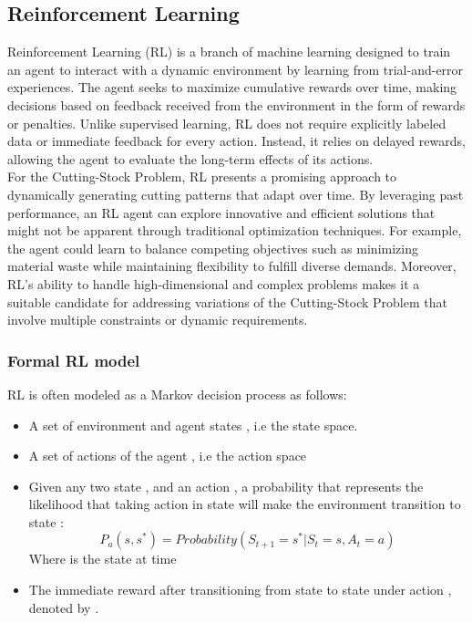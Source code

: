 \documentclass[a4paper]{article}
\begin{document}
    \subsection{Reinforcement Learning}
    Reinforcement Learning (RL) is a branch of machine learning designed to train an agent to interact with a dynamic environment by learning from trial-and-error experiences. The agent seeks to maximize cumulative rewards over time, making decisions based on feedback received from the environment in the form of rewards or penalties. Unlike supervised learning, RL does not require explicitly labeled data or immediate feedback for every action. Instead, it relies on delayed rewards, allowing the agent to evaluate the long-term effects of its actions.
    \vspace{0.2cm}\\
    For the Cutting-Stock Problem, RL presents a promising approach to dynamically generating cutting patterns that adapt over time. By leveraging past performance, an RL agent can explore innovative and efficient solutions that might not be apparent through traditional optimization techniques. For example, the agent could learn to balance competing objectives such as minimizing material waste while maintaining flexibility to fulfill diverse demands. Moreover, RL's ability to handle high-dimensional and complex problems makes it a suitable candidate for addressing variations of the Cutting-Stock Problem that involve multiple constraints or dynamic requirements.

    \subsubsection{Formal RL model}
    RL is often modeled as a Markov decision process as follows:
    \begin{itemize}
        \item A set of environment and agent states , i.e the state space.
        \item A set of actions of the agent , i.e the action space
        \item Given any two state ,  and an action , a probability that represents the likelihood that taking action  in state  will make the environment transition to state : 
                \[P_a(s, s^*) = Probability(S_{t+1} = s^* | S_t = s, A_t = a)\] 
            Where  is the state at time 
        \item The immediate reward after transitioning from state  to state  under action , denoted by . 
    \end{itemize}
\end{document}
